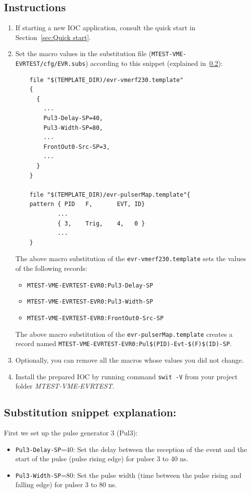 \documentclass[12pt,a4paper]{article}
\begin{document}
\subsection{Instructions}
\begin{enumerate}
	\item If starting a new IOC application, consult the quick start in Section~\ref{sec:Quick start}.

	\item Set the macro values in the substitution file (\texttt{MTEST-VME-EVRTEST/cfg/EVR.subs}) according to this snippet (explained in~\ref{sec:explain_pulser}):
\begin{verbatim}
	file "$(TEMPLATE_DIR)/evr-vmerf230.template"
	{
	  {
	    ...
	    Pul3-Delay-SP=40,
	    Pul3-Width-SP=80,
	    ...
	    FrontOut0-Src-SP=3,
	    ...
	  }
	}

	file "$(TEMPLATE_DIR)/evr-pulserMap.template"{
	pattern { PID   F,       EVT, ID}
	        ...
	        { 3,    Trig,    4,   0 }
	        ...
	}
\end{verbatim}
	The above macro substitution of the \texttt{evr-vmerf230.template} sets the values of the following records:
	\begin{itemize}
	\item \texttt{MTEST-VME-EVRTEST-EVR0:Pul3-Delay-SP}
	\item \texttt{MTEST-VME-EVRTEST-EVR0:Pul3-Width-SP}
	\item \texttt{MTEST-VME-EVRTEST-EVR0:FrontOut0-Src-SP}
	\end{itemize}
	The above macro substitution of the \texttt{evr-pulserMap.template} creates a record named \texttt{MTEST-VME-EVRTEST-EVR0:Pul\$(PID)-Evt-\$(F)\$(ID)-SP}.
	\item Optionally, you can remove all the macros whose values you did not change. 
	\item Install the prepared IOC by running command \texttt{swit -V} from your project folder \textit{MTEST-VME-EVRTEST}.
\end{enumerate}
\subsection{Substitution snippet explanation:}\label{sec:explain_pulser}

First we set up the pulse generator 3 (Pul3):
\begin{itemize}
	\item \texttt{Pul3-Delay-SP}=40: Set the delay between the reception of the event and the start of the pulse (pulse rising edge) for pulser 3 to 40 ns. 
	\item \texttt{Pul3-Width-SP}=80: Set the pulse width (time between the pulse rising and falling edge) for pulser 3 to 80 ns.
\end{itemize}
\end{document}
